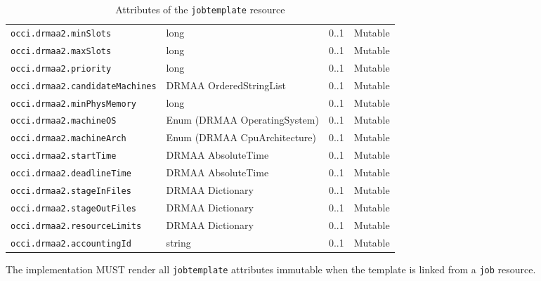 \documentclass[10pt]{article}
\newcommand{\h}[1]{\lstinline|#1|}
\newcommand{\rat}[1]{}
\begin{document}
\begin{table}[ht]
\begin{tabularx}{\textwidth}{|l|X|l|l|}
\h{occi.drmaa2.minSlots}            & long                         & 0..1         & Mutable   \\ 
\h{occi.drmaa2.maxSlots}            & long                         & 0..1         & Mutable   \\ 
\h{occi.drmaa2.priority}            & long                         & 0..1         & Mutable   \\ 
\h{occi.drmaa2.candidateMachines}   & DRMAA OrderedStringList      & 0..1         & Mutable   \\ 
\h{occi.drmaa2.minPhysMemory}       & long                         & 0..1         & Mutable   \\ 
\h{occi.drmaa2.machineOS}           & Enum (DRMAA OperatingSystem) & 0..1         & Mutable   \\
\h{occi.drmaa2.machineArch}         & Enum (DRMAA CpuArchitecture) & 0..1         & Mutable   \\
\h{occi.drmaa2.startTime}           & DRMAA AbsoluteTime           & 0..1         & Mutable   \\
\h{occi.drmaa2.deadlineTime}        & DRMAA AbsoluteTime           & 0..1         & Mutable   \\
\h{occi.drmaa2.stageInFiles}        & DRMAA Dictionary             & 0..1         & Mutable   \\
\h{occi.drmaa2.stageOutFiles}       & DRMAA Dictionary             & 0..1         & Mutable   \\
\h{occi.drmaa2.resourceLimits}      & DRMAA Dictionary             & 0..1         & Mutable   \\
\h{occi.drmaa2.accountingId}        & string                       & 0..1         & Mutable   \\
\hline
\end{tabularx}
\caption{Attributes of the \h{jobtemplate} resource}
\label{tab:jobtemplateattributes}
\end{table}

\rat{DRMAA says that all attributes may have the value UNSET on submission, which maps to mupliplicity zero.}

The implementation MUST render all \h{jobtemplate} attributes immutable when the template is linked from a \h{job} resource.

\rat{This is the case when the job template resource represents the properties of a running job. The other case is the creation of a job template resource by the client for job submission purposes.}

\end{document}
